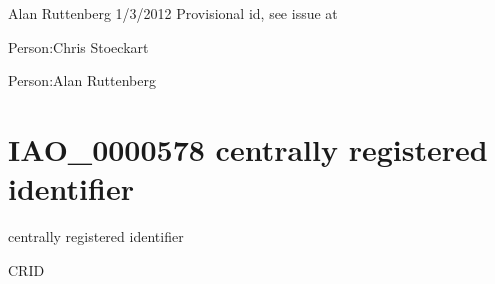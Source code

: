 \documentclass[letterpaper,10pt,english]{sphinxmanual}
\begin{document}
\begin{sphinxShadowBox}

\sphinxAtStartPar
Alan Ruttenberg 1/3/2012 \sphinxhyphen{} Provisional id, see issue at 
\end{sphinxShadowBox}

\begin{sphinxShadowBox}

\sphinxAtStartPar
{}
\end{sphinxShadowBox}

\begin{sphinxShadowBox}

\sphinxAtStartPar
Person:Chris Stoeckart

\sphinxAtStartPar
Person:Alan Ruttenberg
\end{sphinxShadowBox}
\begin{quote}
\label{\detokenize{doc-IAO_0000578:iao-0000578}}\label{\detokenize{doc-IAO_0000578:centrally-registered-identifier}}\label{\detokenize{doc-IAO_0000578:iao-0000578}}
\ignorespaces \end{quote}


\section{IAO\_0000578 \sphinxhyphen{} centrally registered identifier}
\label{\detokenize{doc-IAO_0000578:iao-0000578-centrally-registered-identifier}}\label{\detokenize{doc-IAO_0000578:index-0}}\label{\detokenize{doc-IAO_0000578::doc}}
\begin{sphinxShadowBox}

\sphinxAtStartPar
centrally registered identifier
\end{sphinxShadowBox}

\begin{sphinxShadowBox}

\sphinxAtStartPar
CRID
\end{sphinxShadowBox}
\end{document}
